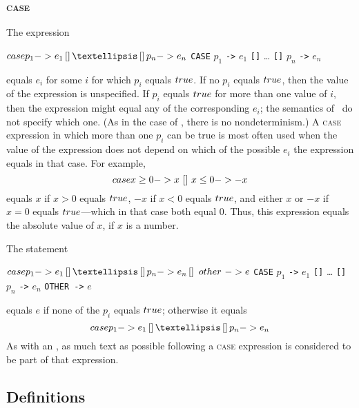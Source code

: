 \documentclass[fleqn,leqno]{article}
\begin{document}
\subsubsection[{\rm \textsc{case}}]{\rm \textsc{case}%
 }
The expression
\begin{twocols}
$\CASE p_{1} -> e_{1} \,[]\, \ldots \,[]\, p_{n} -> e_{n}$
\midcol
\verb|CASE| $p_{1}$ \verb|->| $e_{1}$ \verb|[]| \ldots
  \verb|[]| $p_{n}$ \verb|->| $e_{n}$
\end{twocols}
equals $e_{i}$ for some $i$ for which $p_{i}$ equals $\TRUE$.  If no
$p_{i}$ equals $\TRUE$, then the value of the expression is
unspecified.  
If $p_{i}$ equals $\TRUE$ for more than one value of
$i$, then the expression might equal any of the corresponding $e_{i}$;
the semantics of \tlaplus\ do not specify which one.  (As in the case
of , there is no nondeterminism.)  A
\textsc{case} expression in which more than one $p_{i}$ can be true is
most often used when the value of the expression does not depend on
which of the possible $e_{i}$ the expression equals in that case.  For
example,
 \[ \CASE x \geq 0 -> x \ [] \ x \leq 0 -> -x
 \]
equals $x$ if $x>0$ equals $\TRUE$, $-x$ if $x < 0$ equals $\TRUE$,
and either $x$ or $-x$ if $x=0$ equals $\TRUE$---which in that case
both equal 0.  Thus, this expression equals the absolute value of $x$,
if $x$ is a number.

The statement
\begin{twocols}
$\CASE p_{1} -> e_{1} \,[]\, \ldots \,[]\, p_{n} -> e_{n} \,[]\,
 \ \mbox{\textsc{other}} \ -> e$ 
\midcol
\verb|CASE| $p_{1}$ \verb|->| $e_{1}$ \verb|[]| \ldots
  \verb|[]| $p_{n}$ \verb|->| $e_{n}$ \verb|OTHER ->| $e$
\end{twocols}
equals $e$ if none of the $p_{i}$ equals $\TRUE$; otherwise it equals
 \[ \CASE p_{1} -> e_{1} \,[]\, \ldots \,[]\, p_{n} -> e_{n}
 \]
As with an 
 , 
as much text as possible following a \textsc{case} expression is
considered to be part of that expression.


\subsection[Definitions]{Definitions}
\end{document}

